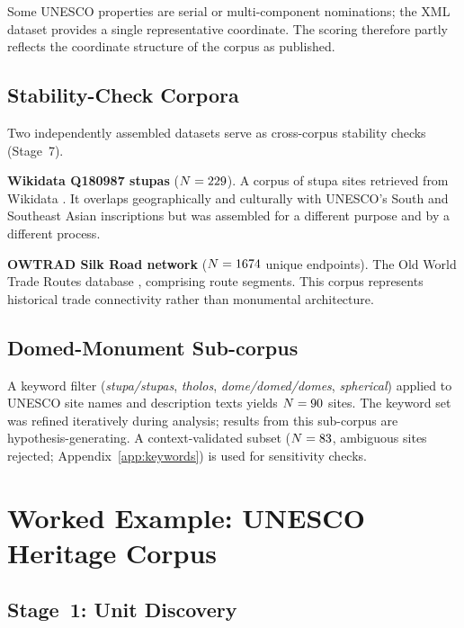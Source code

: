 \documentclass[12pt,a4paper]{article}
\begin{document}
Some UNESCO properties are serial or multi-component nominations; the
XML dataset provides a single representative coordinate. The scoring
therefore partly reflects the coordinate structure of the corpus as
published.

\subsection{Stability-Check Corpora}

Two independently assembled datasets serve as cross-corpus stability
checks (Stage~7).

\textbf{Wikidata Q180987 stupas} ($N = 229$). A corpus of
stupa sites retrieved from Wikidata \citep{tenenbaum2026audit}. It
overlaps geographically and culturally with UNESCO's South and Southeast
Asian inscriptions but was assembled for a different purpose and by a
different process.

\textbf{OWTRAD Silk Road network} ($N = 1674$ unique endpoints).
The Old World Trade Routes database \citep{ciolek2004owtrad}, comprising
\NOwtradEdges{} route segments. This corpus represents historical
trade connectivity rather than monumental architecture.

\subsection{Domed-Monument Sub-corpus}
\label{sec:dome_subset}

A keyword filter (\textit{stupa/stupas}, \textit{tholos},
\textit{dome/domed/domes}, \textit{spherical}) applied to UNESCO site
names and description texts yields $N = 90$ sites. The keyword
set was refined iteratively during analysis; results from this
sub-corpus are hypothesis-generating. A context-validated subset
($N = 83$, \NcircContextRejected{} ambiguous sites
rejected; Appendix~\ref{app:keywords}) is used for sensitivity checks.

\section{Worked Example: UNESCO Heritage Corpus}
\label{sec:worked_example}

\subsection{Stage~1: Unit Discovery}
\end{document}
